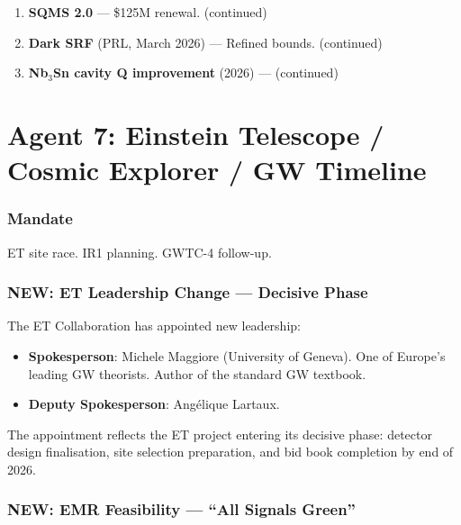 \documentclass[11pt,a4paper]{article}
\newcommand{\NEW}{\textcolor{dfdblue}{\textbf{NEW}}}
\begin{document}
\begin{enumerate}
\item \textbf{SQMS 2.0} --- \$125M renewal. (continued)
\item \textbf{Dark SRF} (PRL, March 2026) --- Refined bounds. (continued)
\item \textbf{Nb$_3$Sn cavity Q improvement} (2026) --- (continued)
\end{enumerate}


\part{Agent 7: Einstein Telescope / Cosmic Explorer / GW Timeline}
\label{part:agent7}

\section{Mandate}

ET site race. IR1 planning. GWTC-4 follow-up.

\section{\NEW: ET Leadership Change --- Decisive Phase}

\begin{tcolorbox}[colback=blue!5!white, colframe=blue!60!black,
  title={\NEW: Michele Maggiore Appointed ET Spokesperson (March 2026)}]

The ET Collaboration has appointed new leadership:
\begin{itemize}
\item \textbf{Spokesperson}: Michele Maggiore (University of Geneva). One of Europe's leading GW theorists. Author of the standard GW textbook.
\item \textbf{Deputy Spokesperson}: Ang\'{e}lique Lartaux.
\end{itemize}

The appointment reflects the ET project entering its decisive phase: detector design finalisation, site selection preparation, and bid book completion by end of 2026.
\end{tcolorbox}

\section{\NEW: EMR Feasibility --- ``All Signals Green''}
\end{document}
